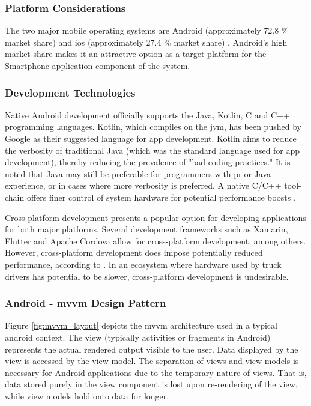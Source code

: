 \subsubsection{Platform Considerations}
The two major mobile operating systems are Android (approximately 72.8 \% market share) and \ac{ios} (approximately 27.4 \% market share) \cite{statcountermaketshare}.
Android's high market share makes it an attractive option as a target platform for the Smartphone application component of the system.

\subsubsection{Development Technologies}
Native Android development officially supports the Java, Kotlin, C and C++ programming languages.
Kotlin, which compiles on the \ac{jvm}, has been pushed by Google as their suggested language for app development.
Kotlin aims to reduce the verbosity of traditional Java (which was the standard language used for app development), thereby reducing the prevalence of "bad coding practices." \cite{flauzino2018you}
It is noted that Java may still be preferable for programmers with prior Java experience, or in cases where more verbosity is preferred.
A native C/C++ tool-chain offers finer control of system hardware for potential performance boosts \cite{kwan2012google}.

Cross-platform development presents a popular option for developing applications for both major platforms.
Several development frameworks such as Xamarin, Flutter and Apache Cordova allow for cross-platform development, among others.
However, cross-platform development does impose potentially reduced performance, according to \cite{biorn2020empirical}.
In an ecosystem where hardware used by truck drivers has potential to be slower, cross-platform development is undesirable.

\subsubsection{Android - \Ac{mvvm} Design Pattern}
Figure \ref{fig:mvvm_layout} depicts the \ac{mvvm} architecture used in a typical android context.
The view (typically activities or fragments in Android) represents the actual rendered output visible to the user.
Data displayed by the view is accessed by the view model.
The separation of views and view models is necessary for Android applications due to the temporary nature of views.
That is, data stored purely in the view component is lost upon re-rendering of the view, while view models hold onto data for longer.\cite{noauthor_guide_nodate}


